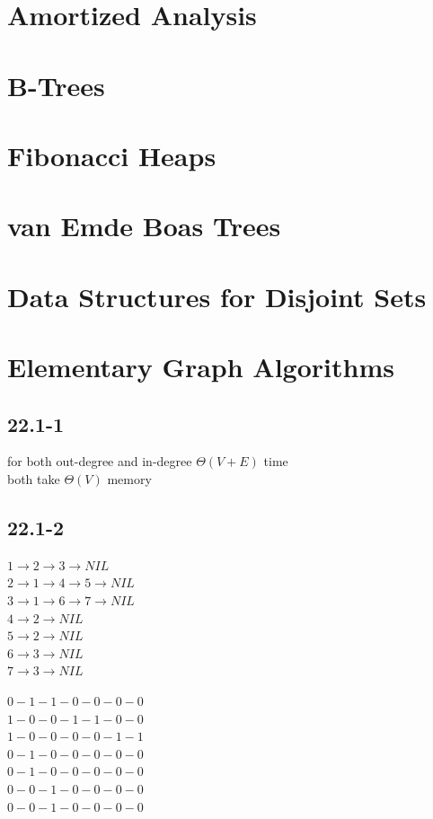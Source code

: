 \documentclass[]{article}
\begin{document}
\section{Amortized Analysis}
\section{B-Trees}
\section{Fibonacci Heaps}
\section{van Emde Boas Trees}
\section{Data Structures for Disjoint Sets}

\section{Elementary Graph Algorithms}

\subsection{22.1-1}
for both out-degree and in-degree $\Theta (V+E)$ time\\
both take $\Theta (V)$ memory

\subsection{22.1-2}

$1 \rightarrow 2 \rightarrow 3 \rightarrow NIL$\\
$2 \rightarrow 1 \rightarrow 4 \rightarrow 5 \rightarrow NIL$\\
$3 \rightarrow 1 \rightarrow 6 \rightarrow 7 \rightarrow NIL$\\
$4 \rightarrow 2 \rightarrow NIL$\\
$5 \rightarrow 2 \rightarrow NIL$\\
$6 \rightarrow 3 \rightarrow NIL$\\
$7 \rightarrow 3 \rightarrow NIL$

$0-1-1-0-0-0-0$\\
$1-0-0-1-1-0-0$\\
$1-0-0-0-0-1-1$\\
$0-1-0-0-0-0-0$\\
$0-1-0-0-0-0-0$\\
$0-0-1-0-0-0-0$\\
$0-0-1-0-0-0-0$
\end{document}
